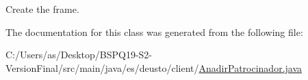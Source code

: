 Create the frame. 

The documentation for this class was generated from the following file\+:\begin{DoxyCompactItemize}
\item 
C\+:/\+Users/as/\+Desktop/\+B\+S\+P\+Q19-\/\+S2-\/\+Version\+Final/src/main/java/es/deusto/client/\mbox{\hyperlink{_anadir_patrocinador_8java}{Anadir\+Patrocinador.\+java}}\end{DoxyCompactItemize}
